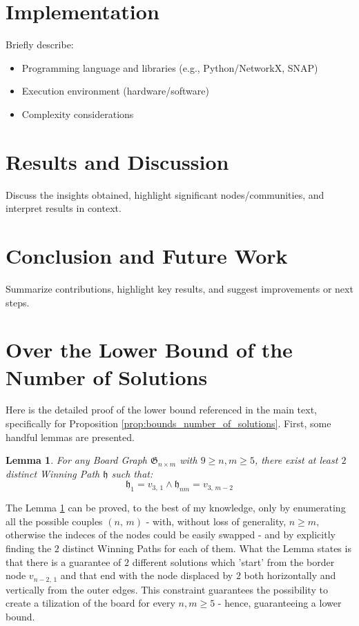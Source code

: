 \documentclass[conference]{IEEEtran}
\newtheorem{lemma}{Lemma}[section]
\begin{document}
\section{Implementation}
Briefly describe:
\begin{itemize}
    \item Programming language and libraries (e.g., Python/NetworkX, SNAP)
    \item Execution environment (hardware/software)
    \item Complexity considerations
\end{itemize}

\section{Results and Discussion}

Discuss the insights obtained, highlight significant nodes/communities, 
and interpret results in context.

\section{Conclusion and Future Work}
Summarize contributions, highlight key results, and suggest improvements or next steps.


\newpage


\newpage
\appendices
\section{Over the Lower Bound of the Number of Solutions}\label{appendix:proof_lower_bound}
Here is the detailed proof of the lower bound referenced in the main text, specifically for Proposition \ref{prop:bounds_number_of_solutions}.
First, some handful lemmas are presented.

\begin{lemma} \label{lem:two_boards_horizontal}
    For any Board Graph $\mathfrak{G}_{n \times m}$ with $9 \ge n, m \ge 5$, there exist at least $2$ distinct Winning Path $\mathfrak{h}$ such that:
    $$
        \mathfrak{h}_1 = v_{3,\,1} \land \mathfrak{h}_{nm} = v_{3,\,m-2} 
    $$
\end{lemma}

The Lemma \ref{lem:two_boards_horizontal} can be proved, to the best of my knowledge, only by enumerating all the possible couples $(n,\,m)$ - with, without loss of generality, $n \ge m$, otherwise the indeces of the nodes could be easily swapped -
and by explicitly finding the $2$ distinct Winning Paths for each of them.
What the Lemma states is that there is a guarantee of $2$ different solutions which 'start' from the border node $v_{n-2,\,1}$ and that end with the node displaced by $2$ both horizontally and vertically from the outer edges.
This constraint guarantees the possibility to create a tilization of the board for every $n, m \ge 5$ - hence, guaranteeing a lower bound.
\end{document}
